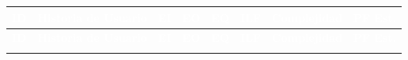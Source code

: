 \documentclass[12pt, a4paper]{article}
\begin{document}
\begin{center}
\scriptsize
\begin{longtable}{>{\bfseries}p{1cm} p{5.8cm} >{\centering\arraybackslash}p{0.6cm} >{\centering\arraybackslash}p{0.6cm} >{\centering\arraybackslash}p{0.6cm} >{\centering\arraybackslash}p{0.6cm} >{\centering\arraybackslash}p{1.4cm} >{\centering\arraybackslash}p{1.2cm}}

  \toprule
  \rowcolor{espeazul}
  \textcolor{white}{\textbf{ID}} &
  \textcolor{white}{\textbf{Historia de Usuario}} &
  \textcolor{white}{\textbf{EI}} &
  \textcolor{white}{\textbf{EO}} &
  \textcolor{white}{\textbf{EQ}} &
  \textcolor{white}{\textbf{ILF}} &
  \textcolor{white}{\textbf{Complejidad}} &
  \textcolor{white}{\textbf{PF Est.}} \\
  \midrule
  \endfirsthead

  \toprule
  \rowcolor{espeazul}
  \textcolor{white}{\textbf{ID}} &
  \textcolor{white}{\textbf{Historia de Usuario}} &
  \textcolor{white}{\textbf{EI}} &
  \textcolor{white}{\textbf{EO}} &
  \textcolor{white}{\textbf{EQ}} &
  \textcolor{white}{\textbf{ILF}} &
  \textcolor{white}{\textbf{Complejidad}} &
  \textcolor{white}{\textbf{PF Est.}} \\
  \midrule
  \endhead

  \bottomrule
  \endfoot


\end{longtable}
\end{center}
\end{document}
